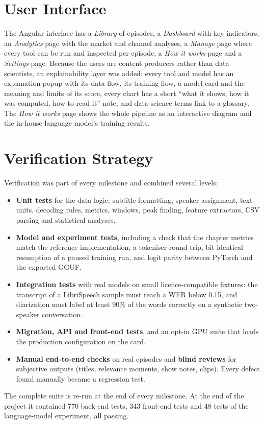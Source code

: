 \section{User Interface}

The Angular interface has a \textit{Library} of episodes, a \textit{Dashboard} with key indicators, an \textit{Analytics} page with the market and channel analyses, a \textit{Manage} page where every tool can be run and inspected per episode, a \textit{How it works} page and a \textit{Settings} page. Because the users are content producers rather than data scientists, an explainability layer was added: every tool and model has an explanation popup with its data flow, its training flow, a model card and the meaning and limits of its score, every chart has a short ``what it shows, how it was computed, how to read it'' note, and data-science terms link to a glossary. The \textit{How it works} page shows the whole pipeline as an interactive diagram and the in-house language model's training results.

\section{Verification Strategy}

Verification was part of every milestone and combined several levels:
\begin{itemize}
\item \textbf{Unit tests} for the data logic: subtitle formatting, speaker assignment, text units, decoding rules, metrics, windows, peak finding, feature extractors, CSV parsing and statistical analyses.
\item \textbf{Model and experiment tests}, including a check that the chapter metrics match the reference implementation, a tokeniser round trip, bit-identical resumption of a paused training run, and logit parity between PyTorch and the exported GGUF.
\item \textbf{Integration tests} with real models on small licence-compatible fixtures: the transcript of a LibriSpeech \cite{panayotov2015librispeech} sample must reach a WER below 0.15, and diarization must label at least 90\% of the words correctly on a synthetic two-speaker conversation.
\item \textbf{Migration, API and front-end tests}, and an opt-in GPU suite that loads the production configuration on the card.
\item \textbf{Manual end-to-end checks} on real episodes and \textbf{blind reviews} for subjective outputs (titles, relevance moments, show notes, clips). Every defect found manually became a regression test.
\end{itemize}
The complete suite is re-run at the end of every milestone. At the end of the project it contained 770 back-end tests, 343 front-end tests and 48 tests of the language-model experiment, all passing.

